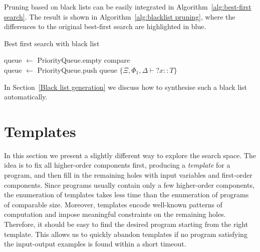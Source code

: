 Pruning based on black lists can be easily integrated in Algorithm~\ref{alg:best-first search}. The result is shown in Algorithm~\ref{alg:blacklist pruning}, where the differences to the original best-first search are highlighted in blue.

\begin{algorithm}
\caption{Best first search with black list\label{alg:blacklist pruning}}

queue $\gets$ PriorityQueue.empty compare\\
queue $\gets$ PriorityQueue.push queue $\{\Xi, \Phi_1, \Delta \vdash {?x} :: T\}$\\

\end{algorithm}

In Section~\ref{Black list generation} we discuss how to synthesise such a black list automatically.

\section{Templates}\label{Templates}
In this section we present a slightly different way to explore the search space. The idea is to fix all higher-order components first, producing a \emph{template} for a program, and then fill in the remaining holes with input variables and first-order components. Since programs usually contain only a few higher-order components, the enumeration of templates takes less time than the enumeration of programs of comparable size. Moreover, templates encode well-known patterns of computation and impose meaningful constraints on the remaining holes. Therefore, it should be easy to find the desired program starting from the right template. This allows us to quickly abandon templates if no program satisfying the input-output examples is found within a short timeout.

